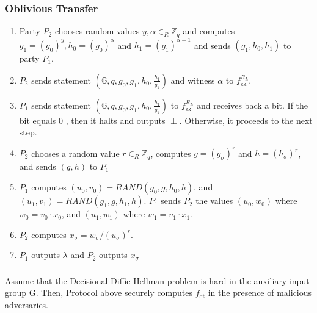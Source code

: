 \documentclass{beamer}
\begin{document}
    \begin{frame}
        \frametitle{Oblivious Transfer}
        
        \begin{enumerate}
            \item Party $P_{2}$ chooses random values $y, \alpha \in_{R} \mathbb{Z}_{q}$ and computes $g_{1}=\left(g_{0}\right)^{y}, h_{0}=\left(g_{0}\right)^{\alpha}$ and $h_{1}=\left(g_{1}\right)^{\alpha+1}$ and sends $\left(g_{1}, h_{0}, h_{1}\right)$ to party $P_{1}$.
            \item $P_{2}$ sends statement $\left(\mathbb{G}, q, g_{0}, g_{1}, h_{0}, \frac{h_{1}}{g_{1}}\right)$ and witness $\alpha$ to $f_{\mathrm{zk}}^{R_{L}}$.
            \item  $P_{1}$ sends statement $\left(\mathbb{G}, q, g_{0}, g_{1}, h_{0}, \frac{h_{1}}{g_{1}}\right)$ to $f_{\mathrm{zk}}^{R_{L}}$ and receives back a bit. If the bit equals 0 , then it halts and outputs $\perp$. Otherwise, it proceeds to the next step.
            \item $P_{2}$ chooses a random value $r \in_{R} \mathbb{Z}_{q}$, computes $g=\left(g_{\sigma}\right)^{r}$ and $h=\left(h_{\sigma}\right)^{r}$, and sends $(g, h)$ to $P_{1}$
            \item $P_{1}$ computes $\left(u_{0}, v_{0}\right)=R A N D\left(g_{0}, g, h_{0}, h\right)$, and $\left(u_{1}, v_{1}\right)=R A N D\left(g_{1}, g, h_{1}, h\right)$. $P_{1}$ sends $P_{2}$ the values $\left(u_{0}, w_{0}\right)$ where $w_{0}=v_{0} \cdot x_{0}$, and $\left(u_{1}, w_{1}\right)$ where $w_{1}=v_{1} \cdot x_{1}$.
            \item $P_{2}$ computes $x_{\sigma}=w_{\sigma} /\left(u_{\sigma}\right)^{r}$.
            \item $P_{1}$ outputs $\lambda$ and $P_{2}$ outputs $x_{\sigma}$
            
        \end{enumerate}
            
       
    
        
    
    \end{frame}

    \begin{frame}
        \frametitle{}
    
        \begin{theorem}
            Assume that the Decisional Diffie-Hellman problem is hard in the auxiliary-input group G. Then, Protocol above securely computes $f_{\text {ot}}$ in the presence of malicious adversaries.
        \end{theorem}
    
    \end{frame}
\end{document}
